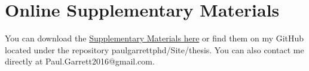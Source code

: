 \documentclass[12pt,oneside]{Thesis}
\begin{document}






 







\clearpage

\backmatter %

\clearpage
{}

\renewcommand\bibname{References}

\clearpage


\appendix
\renewcommand{\appendixname}{Supplementary Material}

\chapter{Online Supplementary Materials}
You can download the \href{https://github.com/paulgarrettphd/Site/raw/master/thesis/SupplementaryMaterials_PaulGarrett_Thesis_2019.pdf}{\color{blue}Supplementary Materials here\color{black}} or find them on my GitHub located under the repository paulgarrettphd/Site/thesis. You can also contact me directly at Paul.Garrett2016@gmail.com.






\end{document}
